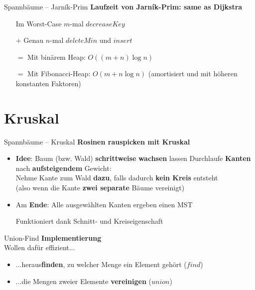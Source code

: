 

\begin{frame}{Spannbäume – Jarník-Prim}
	\textbf{Laufzeit von Jarník-Prim: same as Dijkstra} 
	\begin{itemize}
		\item[] Im Worst-Case $m$-mal $decreaseKey$
		\item[$+$] Genau $n$-mal $deleteMin$ und $insert$
		\pause
		\item[$=$] Mit binärem Heap: $O\left((m+n)\log n\right)$
		\pause
		\item[$=$] Mit Fibonacci-Heap: $O(m + n \log n)$ \quad (amortisiert und mit höheren konstanten Faktoren)
	\end{itemize}
\end{frame}

\section{Kruskal}

\begin{frame}{Spannbäume – Kruskal}
	\textbf{Rosinen rauspicken mit Kruskal} 
	\begin{itemize}
		\item \textbf{Idee}: Baum (bzw. Wald) \textbf{schrittweise} \textbf{wachsen} lassen 
		\pause
		\implitem Durchlaufe \textbf{Kanten} nach \textbf{aufsteigendem} Gewicht: \\
		Nehme Kante zum Wald \textbf{dazu}, falls dadurch \textbf{kein Kreis} entsteht \\
		{\small (also wenn die Kante \textbf{zwei separate} Bäume vereinigt)}
		\pause
		\item Am \textbf{Ende}: Alle ausgewählten Kanten ergeben einen MST
		\pause
		\item[\yop] Funktioniert dank Schnitt- und Kreiseigenschaft
	\end{itemize}
\end{frame}



\begin{frame}{Union-Find}
	\textbf{Implementierung} \\
	Wollen dafür effizient...
	\begin{itemize}
		\item ...heraus\textbf{finden}, zu welcher Menge ein Element gehört ($find$)
		\item ...die Mengen zweier Elemente \textbf{vereinigen} ($union$)
	\end{itemize}
\end{frame}


